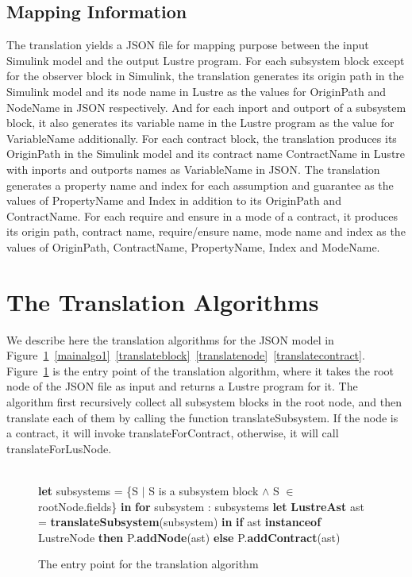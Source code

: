 \documentclass{article}
\begin{document}
\subsection{Mapping Information}

The translation yields a JSON file for mapping purpose between the input Simulink model and the output Lustre program. 
For each subsystem block except for the observer block in Simulink, the translation generates its origin path in the Simulink model and its node name in Lustre as the values for \textsf{OriginPath} and \textsf{NodeName} in JSON respectively.
And for each inport and outport of a subsystem block, it also generates its variable name in the Lustre program as the value for \textsf{VariableName} additionally.
For each contract block, the translation produces its \textsf{OriginPath} in the Simulink model and its contract name \textsf{ContractName} in Lustre with inports and outports names as \textsf{VariableName} in JSON.
The translation generates a property name and index for each assumption and guarantee as the values of \textsf{PropertyName} and \textsf{Index} in addition to its \textsf{OriginPath} and \textsf{ContractName}.
For each require and ensure in a mode of a contract, it produces its origin path, contract name, require/ensure name, mode name and index as the values of 
\textsf{OriginPath}, \textsf{ContractName}, \textsf{PropertyName}, \textsf{Index} and \textsf{ModeName}.

\section{The Translation Algorithms}

We describe here the translation algorithms for the JSON model in Figure~\ref{mainalgo}~\ref{mainalgo1}~\ref{translateblock}~\ref{translatenode}~\ref{translatecontract}.
Figure~\ref{mainalgo} is the entry point of the translation algorithm, where it takes the root node of the JSON file as input and returns a Lustre program for it.
The algorithm first recursively collect all subsystem blocks in the root node, and then translate each of them by calling the function \textsf{translateSubsystem}. 
If the node is a contract, it will invoke \textsf{translateForContract}, 
otherwise, it will call \textsf{translateForLusNode}.


\begin{figure}
\begin{algorithmic}
\\
\State \textbf{let} subsystems = \{S $\mid$ S is a subsystem block $\land$ S $\in$ rootNode.fields\} \textbf{in}
\State \textbf{for} subsystem : subsystems
\State {\ \ \ \ } \textbf{let} \textbf{LustreAst} ast = \textbf{translateSubsystem}(subsystem) \textbf{in}
\State {\ \ \ \ } \textbf{if}  ast \textbf{instanceof} LustreNode \textbf{then}
\State {\ \ \ \ \ \ \ \ } P.\textbf{addNode}(ast)
\State {\ \ \ \ } \textbf{else}
\State {\ \ \ \ \ \ \ \ } P.\textbf{addContract}(ast)
\EndFunction
\end{algorithmic}
\label{mainalgo}
\caption{The entry point for the translation algorithm}
\end{figure}
\end{document}
